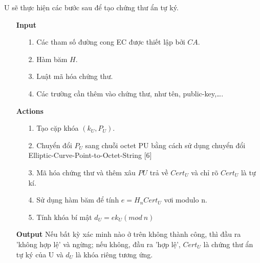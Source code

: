 \documentclass[a4paper,12pt]{report}
\begin{document}
U sẽ thực hiện các bước sau để tạo chứng thư ẩn tự ký.
\begin{itemize}
\item[] \textbf{Input}
\begin{itemize}
\item[1. ] Các tham số đường cong EC được thiết lập bởi $CA$.
\item[2. ] Hàm băm $H$.
\item[3. ] Luật mã hóa chứng thư.
\item[4. ] Các trường cần thêm vào chứng thư, như tên, public-key,\ldots .
\end{itemize}
\item[] \textbf{Actions}
\begin{itemize}
\item[1. ] Tạo cặp khóa $(k_U, P_U)$.
\item[2. ] Chuyển đổi $P_U$ sang chuỗi octet PU bằng cách sử dụng chuyển đổi Elliptic-Curve-Point-to-Octet-String [6]
\item[3. ] Mã hóa chứng thư và thêm xâu $PU$ trả về $Cert_U$ và chỉ rõ $Cert_U$ là tự kí.
\item[4. ] Sử dụng hàm băm để tính $e = H_n{Cert_U}$ vơi modulo n.
\item[5. ] Tính khóa bí mật $d_U = ek_U (mod \ n)$
\end{itemize}
\item[] \textbf{Output} Nếu bất kỳ xác minh nào ở trên không thành công, thì đầu ra 'không hợp lệ' và ngừng; nếu không, đầu ra 'hợp lệ', $Cert_U$ là chứng thư ẩn tự ký của U và $d_U$ là khóa riêng tương ứng.
\end{itemize}
\end{document}
